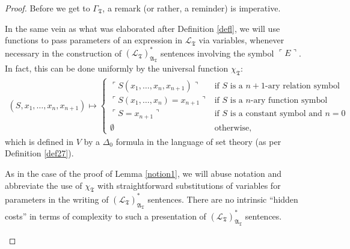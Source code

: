 \documentclass[12pt]{article}
\numberwithin{equation}{section}
\begin{document}
\begin{proof}
Before we get to $\Gamma_{\mathfrak{T}}$, a remark (or rather, a reminder) is imperative.

\begin{rem}\label{subsafe2}
In the same vein as what was elaborated after Definition \ref{defl}, we will use functions to pass parameters of an expression in $\mathcal{L}_{\mathfrak{T}}$ via variables, whenever necessary in the construction of $({\mathcal{L}_{\mathfrak{T}}})^*_{\mathfrak{A}_{\mathfrak{T}}}$ sentences involving the symbol $\ulcorner E \urcorner$. In fact, this can be done uniformly by the universal function $\chi_{\mathfrak{T}}$: 
\begin{align*}
    (S, x_1, \dots, x_n, x_{n+1}) \mapsto 
    \begin{cases}
        \ulcorner S(x_1, \dots, x_n, x_{n+1}) \urcorner & \text{if } S \text{ is a } n+1 \text{-ary relation symbol} \\
        \ulcorner S(x_1, \dots, x_n) = x_{n+1} \urcorner & \text{if } S \text{ is a } n \text{-ary function symbol }\\
        \ulcorner S = x_{n+1} \urcorner & \text{if } S \text{ is a } \text{constant symbol and } n = 0 \\
        \emptyset & \text{otherwise},
    \end{cases}
\end{align*}
which is defined in $V$ by a $\Delta_0$ formula in the language of set theory (as per Definition \ref{def27}).

As in the case of the proof of Lemma \ref{notion1}, we will abuse notation and abbreviate the use of $\chi_{\mathfrak{T}}$ with straightforward substitutions of variables for parameters in the writing of $({\mathcal{L}_{\mathfrak{T}}})^*_{\mathfrak{A}_{\mathfrak{T}}}$ sentences. There are no intrinsic ``hidden costs'' in terms of complexity to such a presentation of $({\mathcal{L}_{\mathfrak{T}}})^*_{\mathfrak{A}_{\mathfrak{T}}}$ sentences.
\end{rem}


\end{proof}
\end{document}

